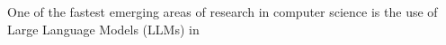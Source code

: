 One of the fastest emerging areas of research in computer science is the use of Large Language Models (LLMs) in